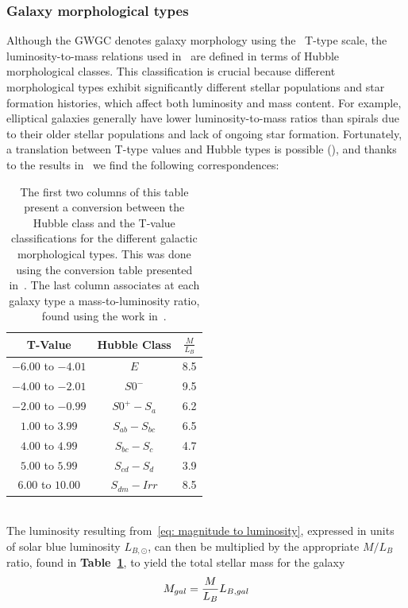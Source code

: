 \subsubsection{Galaxy morphological types}
Although the GWGC denotes galaxy morphology using the~\cite{Vaculeurs} T-type scale, the luminosity-to-mass relations used in~\cite{Faber&Gallagher} are defined in terms of Hubble morphological classes.
This classification is crucial because different morphological types exhibit significantly different stellar populations and star formation histories, which affect both luminosity and mass content.
For example, elliptical galaxies generally have lower luminosity-to-mass ratios than spirals due to their older stellar populations and lack of ongoing star formation.
Fortunately, a translation between T-type values and Hubble types is possible (\cite{De_Vaucouleurs_1974}), and thanks to the results in~\cite{Faber&Gallagher} we find the following correspondences:
\begin{table}[h!]
    \centering
    \begin{tabular}{ccc}
        T-Value & Hubble Class & $\frac{M}{L_B}$ \\
        \toprule
        $-6.00$ to $-4.01$ & $E$ & 8.5\\
        $-4.00$ to $-2.01$ & $S0^-$ & 9.5\\
        $-2.00$ to $-0.99$ & $S0^+-S_a$ & 6.2\\
        $1.00$ to $3.99$ & $S_{ab}-S_{bc}$ & 6.5\\
        $4.00$ to $4.99$ & $S_{bc}-S_{c}$ & 4.7\\
        $5.00$ to $5.99$ & $S_{cd}-S_{d}$ & 3.9\\
        $6.00$ to $10.00$ & $S_{dm}-Irr$ & 8.5\\
        \bottomrule
    \end{tabular}
    \caption{The first two columns of this table present a conversion between the Hubble class and the T-value classifications for the different galactic morphological types.
    This was done using the conversion table presented in~\cite{De_Vaucouleurs_1974}.
    The last column associates at each galaxy type a mass-to-luminosity ratio, found using the work in~\cite{Faber&Gallagher}.}\label{tab: mass luminosity conversions tab}
\end{table}
\vspace{3mm}\\
The luminosity resulting from~\eqref{eq: magnitude to luminosity}, expressed in units of solar blue luminosity $L_{B,\odot}$, can then be multiplied by the appropriate $M/L_B$ ratio, found in \textbf{Table~\ref{tab: mass luminosity conversions tab}}, to yield the total stellar mass for the galaxy
\begin{equation}
    M_{gal} = \frac{M}{L_B}L_{B,gal}
    \notag
\end{equation}


